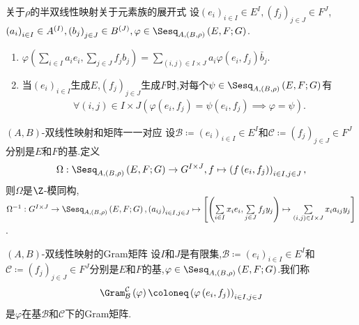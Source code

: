 \begin{proposition}{关于$\rho$的半双线性映射关于元素族的展开式}{}
	设$\left(e_{i}\right)_{i\in I}\in E^{I},\left(f_{j}\right)_{j\in J}\in F^{J}$,$\left(a_{i}\right)_{i\in I}\in A^{\left(I\right)},\left(b_{j}\right)_{j\in J}\in B^{\left(J\right)},\varphi\in\Sesq_{A,(B,\rho)}\left(E,F;G\right)$.
	\begin{enumerate}
		\item $\varphi\left(\sum\limits_{i\in I}a_{i}e_{i},\sum\limits_{j\in J}f_{j}b_{j}\right)=\sum\limits_{\left(i,j\right)\in I\times J}a_{i}\varphi\left(e_{i},f_{j}\right)\bar{b}_{j}$.
		\item 当$\left(e_{i}\right)_{i\in I}$生成$E$,$\left(f_{j}\right)_{j\in J}$生成$F$时,对每个$\psi\in\Sesq_{A,(B,\rho)}\left(E,F;G\right)$有
		\begin{align*}
			\forall\left(i,j\right)\in I\times J\left(\varphi\left(e_{i},f_{j}\right)=\psi\left(e_{i},f_{j}\right)\implies\varphi=\psi\right).
		\end{align*}
	\end{enumerate}
\end{proposition}

\begin{proposition}{$\left(A,B\right)$-双线性映射和矩阵一一对应}{}
	设$\mathcal{B}\coloneq\left(e_{i}\right)_{i\in I}\in E^{I}$和$\mathcal{C}\coloneq\left(f_{j}\right)_{j\in J}\in F^{J}$分别是$E$和$F$的基.定义
	\begin{align*}
		\Omega:\Sesq_{A,(B,\rho)}\left(E,F;G\right)\to G^{I\times J},f\mapsto\left(f\left(e_{i},f_{j}\right)\right)_{i\in I,j\in J},
	\end{align*}
	则$\Omega$是$\Z$-模同构,$\Omega^{-1}:G^{I\times J}\to\Sesq_{A,(B,\rho)}\left(E,F;G\right),\left(a_{ij}\right)_{i\in I,j\in J}\mapsto\left[\left(\sum\limits_{i\in I}x_{i}e_{i},\sum\limits_{j\in J}f_{j}y_{j}\right)\mapsto\sum\limits_{\left(i,j\right)\in I\times J}x_{i}a_{ij}y_{j}\right]$.
\end{proposition}

\begin{definition}{$\left(A,B\right)$-双线性映射的Gram矩阵}{}
	设$I$和$J$是有限集,$\mathcal{B}\coloneq\left(e_{i}\right)_{i\in I}\in E^{I}$和$\mathcal{C}\coloneq\left(f_{j}\right)_{j\in J}\in F^{J}$分别是$E$和$F$的基,$\varphi\in\Sesq_{A,(B,\rho)}\left(E,F;G\right)$.我们称
	\begin{align*}
		\Gram_{\mathcal{B}}^{\mathcal{C}}\left(\varphi\right)\coloneq\left(\varphi\left(e_{i},f_{j}\right)\right)_{i\in I,j\in J}
	\end{align*}
	是$\varphi$在基$\mathcal{B}$和$\mathcal{C}$下的Gram矩阵.
\end{definition}

